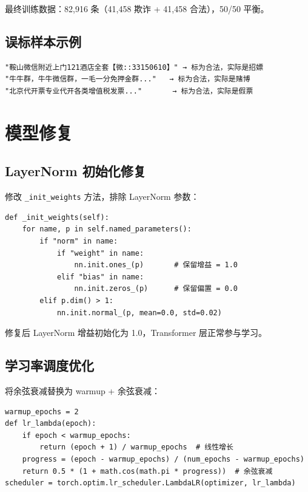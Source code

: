 \documentclass[11pt,a4paper]{article}
\begin{document}
最终训练数据：82,916 条（41,458 欺诈 + 41,458 合法），50/50 平衡。

\subsection{误标样本示例}

\begin{Verbatim}[frame=single,fontsize=\small,label=误标为合法的欺诈样本示例]
"鞍山微信附近上门121酒店全套【微::33150610】" → 标为合法，实际是招嫖
"牛牛群，牛牛微信群，一毛一分免押金群..."   → 标为合法，实际是赌博
"北京代开票专业代开各类增值税发票..."       → 标为合法，实际是假票
\end{Verbatim}

\section{模型修复}

\subsection{LayerNorm 初始化修复}

修改 \texttt{\_init\_weights} 方法，排除 LayerNorm 参数：

\begin{Verbatim}[frame=single,fontsize=\small]
def _init_weights(self):
    for name, p in self.named_parameters():
        if "norm" in name:
            if "weight" in name:
                nn.init.ones_(p)       # 保留增益 = 1.0
            elif "bias" in name:
                nn.init.zeros_(p)      # 保留偏置 = 0.0
        elif p.dim() > 1:
            nn.init.normal_(p, mean=0.0, std=0.02)
\end{Verbatim}

修复后 LayerNorm 增益初始化为 1.0，Transformer 层正常参与学习。

\subsection{学习率调度优化}

将余弦衰减替换为 warmup + 余弦衰减：

\begin{Verbatim}[frame=single,fontsize=\small]
warmup_epochs = 2
def lr_lambda(epoch):
    if epoch < warmup_epochs:
        return (epoch + 1) / warmup_epochs  # 线性增长
    progress = (epoch - warmup_epochs) / (num_epochs - warmup_epochs)
    return 0.5 * (1 + math.cos(math.pi * progress))  # 余弦衰减
scheduler = torch.optim.lr_scheduler.LambdaLR(optimizer, lr_lambda)
\end{Verbatim}
\end{document}
